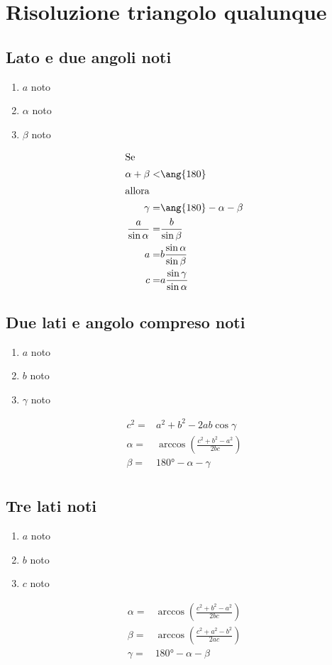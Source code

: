 \chapter{Risoluzione triangolo qualunque}
{\centering
	
	\par}
\section{Lato e  due angoli noti}
\begin{enumerate}
	\item $a$ noto
	\item $\alpha$ noto
	\item $\beta$ noto
\end{enumerate}
\begin{align*}
\intertext{Se}
\alpha+\beta<&\ang{180}\\
\intertext{allora}
\gamma=&\ang{180}-\alpha-\beta\\
\frac{a}{\sin\alpha}=&\frac{b}{\sin\beta}\\
a=&b\frac{\sin\alpha}{\sin\beta}\\
c=&a\frac{\sin\gamma}{\sin\alpha}
\end{align*}
\section{Due lati e angolo compreso noti}
\begin{enumerate}
	\item $a$ noto
	\item $b$ noto
	\item $\gamma$ noto
\end{enumerate}
\begin{align*}
c^2=&a^2+b^2-2ab\cos\gamma\\
\alpha=&\arccos\left(\frac{c^2+b^2-a^2}{2bc} \right)\\
\beta=&\ang{180}-\alpha-\gamma\\
\end{align*}
\section{Tre lati noti}
\begin{enumerate}
	\item $a$ noto
	\item $b$ noto
	\item $c$ noto
\end{enumerate}
\begin{align*}
\alpha=&\arccos\left(\frac{c^2+b^2-a^2}{2bc} \right)\\
\beta=&\arccos\left(\frac{c^2+a^2-b^2}{2ac} \right)\\
\gamma=&\ang{180}-\alpha-\beta\\
\end{align*}
